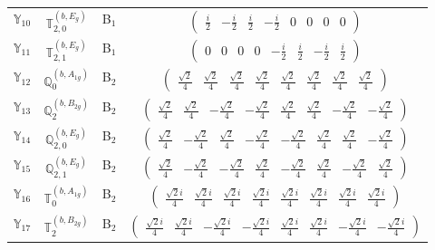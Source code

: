 \documentclass[fleqn,10pt,landscape]{article}
\begin{document}
\begin{itemize}
\begin{center}
\begin{longtable}{c|c|c|c}
$ \mathbb{Y}_{10} $ & $\mathbb{T}_{2,0}^{(b,E_{g})}$ & B$_{1}$ & $\begin{pmatrix} \frac{i}{2} & - \frac{i}{2} & \frac{i}{2} & - \frac{i}{2} & 0 & 0 & 0 & 0 \end{pmatrix}$ \\
$ \mathbb{Y}_{11} $ & $\mathbb{T}_{2,1}^{(b,E_{g})}$ & B$_{1}$ & $\begin{pmatrix} 0 & 0 & 0 & 0 & - \frac{i}{2} & \frac{i}{2} & - \frac{i}{2} & \frac{i}{2} \end{pmatrix}$ \\ \hline
$ \mathbb{Y}_{12} $ & $\mathbb{Q}_{0}^{(b,A_{1g})}$ & B$_{2}$ & $\begin{pmatrix} \frac{\sqrt{2}}{4} & \frac{\sqrt{2}}{4} & \frac{\sqrt{2}}{4} & \frac{\sqrt{2}}{4} & \frac{\sqrt{2}}{4} & \frac{\sqrt{2}}{4} & \frac{\sqrt{2}}{4} & \frac{\sqrt{2}}{4} \end{pmatrix}$ \\
$ \mathbb{Y}_{13} $ & $\mathbb{Q}_{2}^{(b,B_{2g})}$ & B$_{2}$ & $\begin{pmatrix} \frac{\sqrt{2}}{4} & \frac{\sqrt{2}}{4} & - \frac{\sqrt{2}}{4} & - \frac{\sqrt{2}}{4} & \frac{\sqrt{2}}{4} & \frac{\sqrt{2}}{4} & - \frac{\sqrt{2}}{4} & - \frac{\sqrt{2}}{4} \end{pmatrix}$ \\
$ \mathbb{Y}_{14} $ & $\mathbb{Q}_{2,0}^{(b,E_{g})}$ & B$_{2}$ & $\begin{pmatrix} \frac{\sqrt{2}}{4} & - \frac{\sqrt{2}}{4} & \frac{\sqrt{2}}{4} & - \frac{\sqrt{2}}{4} & - \frac{\sqrt{2}}{4} & \frac{\sqrt{2}}{4} & \frac{\sqrt{2}}{4} & - \frac{\sqrt{2}}{4} \end{pmatrix}$ \\
$ \mathbb{Y}_{15} $ & $\mathbb{Q}_{2,1}^{(b,E_{g})}$ & B$_{2}$ & $\begin{pmatrix} \frac{\sqrt{2}}{4} & - \frac{\sqrt{2}}{4} & - \frac{\sqrt{2}}{4} & \frac{\sqrt{2}}{4} & - \frac{\sqrt{2}}{4} & \frac{\sqrt{2}}{4} & - \frac{\sqrt{2}}{4} & \frac{\sqrt{2}}{4} \end{pmatrix}$ \\
$ \mathbb{Y}_{16} $ & $\mathbb{T}_{0}^{(b,A_{1g})}$ & B$_{2}$ & $\begin{pmatrix} \frac{\sqrt{2} i}{4} & \frac{\sqrt{2} i}{4} & \frac{\sqrt{2} i}{4} & \frac{\sqrt{2} i}{4} & \frac{\sqrt{2} i}{4} & \frac{\sqrt{2} i}{4} & \frac{\sqrt{2} i}{4} & \frac{\sqrt{2} i}{4} \end{pmatrix}$ \\
$ \mathbb{Y}_{17} $ & $\mathbb{T}_{2}^{(b,B_{2g})}$ & B$_{2}$ & $\begin{pmatrix} \frac{\sqrt{2} i}{4} & \frac{\sqrt{2} i}{4} & - \frac{\sqrt{2} i}{4} & - \frac{\sqrt{2} i}{4} & \frac{\sqrt{2} i}{4} & \frac{\sqrt{2} i}{4} & - \frac{\sqrt{2} i}{4} & - \frac{\sqrt{2} i}{4} \end{pmatrix}$ \\

\end{longtable}
\end{center}
\end{itemize}
\end{document}
